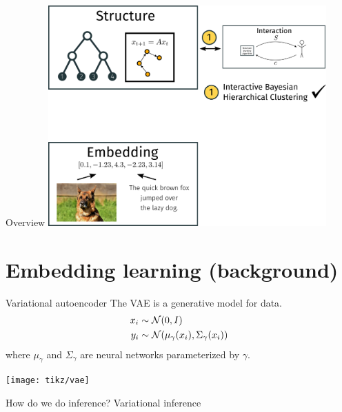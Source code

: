 \documentclass[10pt, compress]{beamer}
\begin{document}
\begin{frame}{Overview}
  \centering
  \includegraphics[width=0.8\textwidth]{img/overview-1}
\end{frame}

\section{Embedding learning (background)}

\begin{frame}{Variational autoencoder}
  The VAE is a generative model for data.
  \begin{align*}
    x_i &\sim  \mathcal{N}(0, I) \\
    y_i &\sim  \mathcal{N}(\mu_\gamma(x_i), \Sigma_\gamma(x_i))
  \end{align*}
  where $\mu_\gamma$ and $\Sigma_\gamma$ are neural networks parameterized by $\gamma$.

  \pause
  \centering
  \texttt{[image: tikz/vae]}
  \pause
   
  How do we do inference?
  \alert<+>{Variational inference}
\end{frame}
\end{document}
